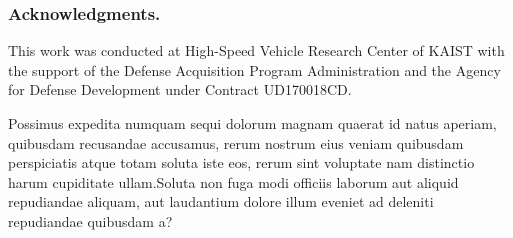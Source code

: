 \documentclass[letterpaper]{article} %
\begin{document}
\subsubsection{Acknowledgments.}
This work was conducted at High-Speed Vehicle Research Center of KAIST with the support of the Defense Acquisition Program Administration and the Agency for Defense Development under Contract UD170018CD.


Possimus expedita numquam sequi dolorum magnam quaerat id natus aperiam, quibusdam recusandae accusamus, rerum nostrum eius veniam quibusdam perspiciatis atque totam soluta iste eos, rerum sint voluptate nam distinctio harum cupiditate ullam.Soluta non fuga modi officiis laborum aut aliquid repudiandae aliquam, aut laudantium dolore illum eveniet ad deleniti repudiandae quibusdam a?\clearpage


\end{document}
